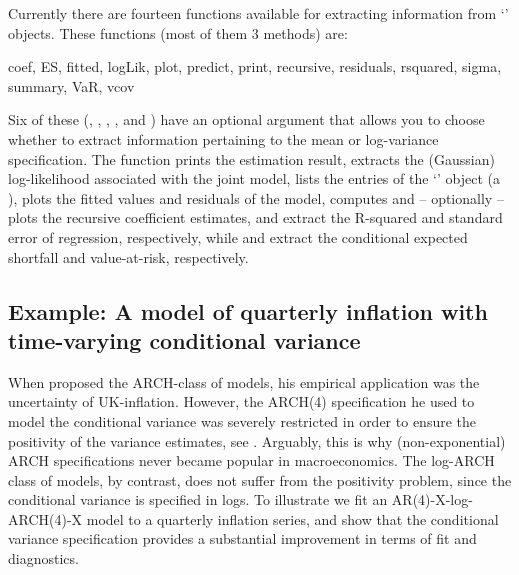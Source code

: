 \documentclass[article,nojss]{jss}
\begin{document}
Currently there are fourteen functions available for extracting
information from `' objects. These functions (most of them
3 methods) are:
%
\begin{Code}
  coef, ES, fitted, logLik, plot, predict, print, recursive, residuals,
  rsquared, sigma, summary, VaR, vcov
\end{Code}
%
Six of these (, , ,
,  and ) have an optional
argument that allows you to choose whether to extract information
pertaining to the mean or log-variance specification. The 
function prints the estimation result,  extracts the
(Gaussian) log-likelihood associated with the joint model,
 lists the entries of the `' object (a
),  plots the fitted values and residuals of the
model,  computes and -- optionally -- plots the
recursive coefficient estimates,  and 
extract the R-squared and standard error of regression, respectively,
while  and  extract the conditional expected
shortfall and value-at-risk, respectively.

\subsection{Example: A model of quarterly inflation with time-varying conditional variance}
\label{subsec:arx:example}

When \cite{Engle82} proposed the ARCH-class of models, his empirical application was the uncertainty of UK-inflation. However, the ARCH(4) specification he used to model the conditional variance was severely restricted in order to ensure the positivity of the variance estimates, see \citet[][p.~1002]{Engle82}. Arguably, this is why (non-exponential) ARCH specifications never became popular in macroeconomics. The log-ARCH class of models, by contrast, does not suffer from the positivity problem, since the conditional variance is specified in logs. To illustrate we fit an AR(4)-X-log-ARCH(4)-X model to a quarterly inflation series, and show that the conditional variance specification provides a substantial improvement in terms of fit and diagnostics.
\end{document}
